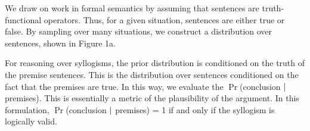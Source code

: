 \documentclass[10pt,letterpaper]{article}
\begin{document}
We draw on work in formal semantics by assuming that sentences are truth-functional operators. Thus, for a given situation, sentences are either true or false. By sampling over many situations, we construct a distribution over sentences, shown in Figure 1a.

For reasoning over syllogisms, the prior distribution is conditioned on the truth of the premise sentences. This is the distribution over sentences conditioned on the fact that the premises are true. In this way, we evaluate the $\Pr$(conclusion $\arrowvert$ premises). This is essentially a metric of the plausibility of the argument. In this formulation, $\Pr$(conclusion $\arrowvert$ premises) = 1 if and only if the syllogism is logically valid.

%
%
%
%
%
\end{document}

